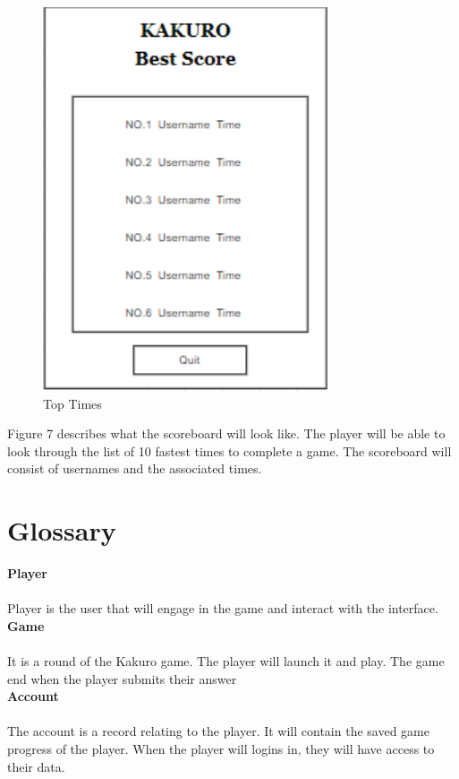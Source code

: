 \documentclass[12pt]{article}
\begin{document}
\begin{figure}[htbp]
    \centering
    \includegraphics[scale=0.8]{UI-4.png}
    \caption{Top Times}
    \label{fig:UI-4}
\end{figure}

Figure 7 describes what the scoreboard will look like. The player will be able to look through the list of 10 fastest times to complete a game. The scoreboard will consist of usernames and the associated times.

\newpage

\section{Glossary}

\textbf{Player} \\\\
Player is the user that will engage in the game and interact with the interface.\\


\textbf{Game} \\\\
It is a round of the Kakuro game. The player will launch it and play. The game end when the player submits  their answer\\

\textbf{Account} \\\\
The account is a record relating to the player. It will contain the saved game progress of the player. When the player will logins in, they will have access to their data.\\
\end{document}
